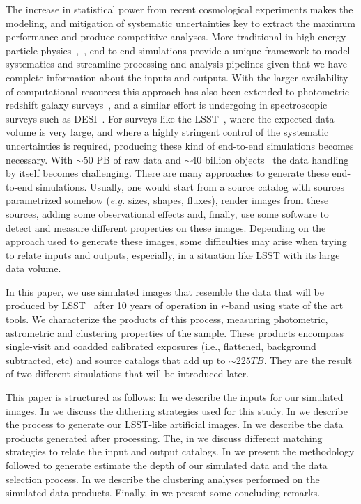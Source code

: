 \documentclass[\docopts]{\docclass}
\begin{document}
The increase in statistical power from recent cosmological experiments makes the modeling, and mitigation of systematic uncertainties key to extract the maximum performance and produce competitive analyses. More traditional in high energy particle physics~\citep{Brun:118715},~\citep{2006JHEP...05..026S}, end-to-end simulations provide a unique framework to
model systematics and streamline processing and analysis pipelines given that we have complete information about the inputs and outputs. With the larger availability of computational resources this approach has also been extended to photometric redshift galaxy surveys~\citep{2016MNRAS.457..786S,2016ApJ...817...25B}, and a similar effort is undergoing in spectroscopic surveys such as DESI~\citep{2016arXiv161100036D}. For surveys like the LSST~\citep{2008arXiv0805.2366I}, where the expected data volume is very large, and where a highly stringent control of the systematic uncertainties is required, producing these
kind of end-to-end simulations becomes necessary. With $\sim 50$ PB of raw data and $\sim 40$ billion objects~\citep{2008arXiv0805.2366I} the data handling by itself becomes challenging. There are many approaches to generate these end-to-end simulations. Usually, one would start from a source catalog with sources parametrized somehow (\textit{e.g.} sizes, shapes, fluxes), render images from these sources, adding some observational effects and, finally, use some software to detect and measure different properties on these images. Depending on the approach used to generate these images, some difficulties may arise when trying to relate inputs and outputs, especially, in a situation like LSST with its large data volume. 

In this paper, we use simulated images that resemble the data that will be produced by
LSST~\citep{2008arXiv0805.2366I} after 10 years of operation in $r$-band using state of the art tools. We characterize the products of this process, measuring photometric, astrometric and clustering properties of the sample. These products encompass single-visit and coadded calibrated exposures (i.e., flattened, background subtracted, etc) and source catalogs that add up to $\sim 225 TB$. They are the result of two different simulations that will be introduced later.

This paper is structured as follows: In  we describe the inputs for our simulated images. In  we discuss the dithering strategies used for this study. In  we describe the process to generate our LSST-like artificial images. In  we describe the data products generated after processing. The, in  we discuss different matching strategies to relate the input and output catalogs. In  we present the methodology followed to generate estimate the depth of our simulated data and the data selection process. In  we describe the clustering analyses performed on the simulated data products. Finally, in  we present some concluding remarks.
\end{document}

